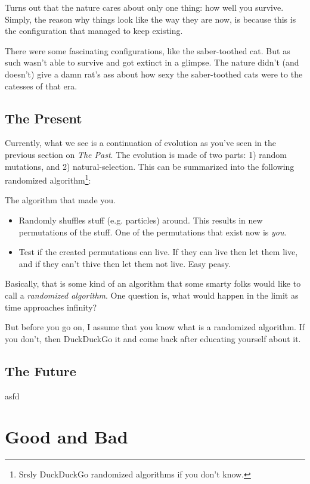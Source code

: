 \documentclass{report}
\begin{document}
Turns out that the nature cares about only one thing: how well you survive.
Simply, the reason why things look like the way they are now, is because
this is the configuration that managed to keep existing.

There were some fascinating configurations, like the saber-toothed cat. But as
such wasn't able to survive and got extinct in a glimpse. The nature didn't
(and doesn't) give a damn rat's ass about how sexy the saber-toothed cats were
to the catesses of that era.

\section{The Present}
Currently, what we see is a continuation of evolution as you've seen in the
previous section on \emph{The Past}. The evolution is made of two parts: 1)
random mutations, and 2) natural-selection. This can be summarized into the
following randomized algorithm\footnote{Srsly DuckDuckGo randomized algorithms
if you don't know.}:

\begin{algorithm}
\caption{The algorithm that made you.}
\begin{algorithmic}
    \ELSE
    \ENDIF
    \ENDFOR
\end{algorithmic}
\end{algorithm}

\begin{itemize}
    \item Randomly shuffles stuff (e.g. particles) around. This results in new
    permutations of the stuff. One of the permutations that exist now is
    \emph{you}. 
    \item Test if the created permutations can live. If they can live then let
    them live, and if they can't thive then let them not live. Easy peasy.
\end{itemize}

Basically, that is some kind of an algorithm that some smarty folks would like
to call a \emph{randomized algorithm}. One question is, what would happen in
the limit as time approaches infinity?

But before you go on, I assume that you know what is a randomized algorithm. If
you don't, then DuckDuckGo it and come back after educating yourself about it.


\section{The Future}
asfd




\chapter{Good and Bad}
\end{document}
